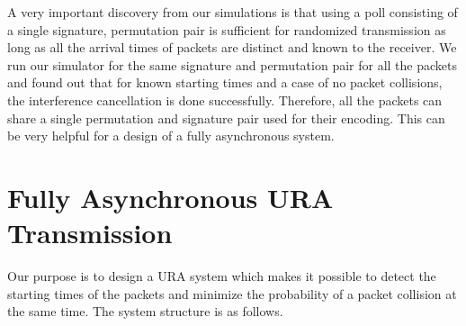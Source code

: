 \documentclass[journal,onecolumn,12pt]{IEEEtran}
\begin{document}
A very important discovery from our simulations is that using a poll consisting of a single signature, permutation pair is sufficient for randomized transmission as long as all the arrival times of packets are distinct and known to the receiver. We run our simulator for the same signature and permutation pair for all the packets and found out that for known starting times and a case of no packet collisions, the interference cancellation is done successfully. Therefore, all the packets can share a single permutation and signature pair used for their encoding. This can be very helpful for a design of a fully asynchronous system.

\fi

\section{Fully Asynchronous URA Transmission} 
\label{sec:FAT}

Our purpose is to design a URA system which makes it possible to detect the starting times of the packets and minimize the probability of a packet collision at the same time. The system structure is as follows.


\end{document}
